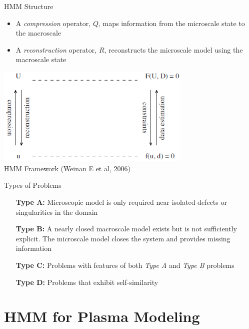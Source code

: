 \documentclass{beamer}
\begin{document}
	\begin{frame}{HMM Structure}
		\begin{itemize}
			\item  A \emph{compression} operator, $Q$, maps information from the microscale state to the macroscale
			\item  A \emph{reconstruction} operator, $R$, reconstructs the microscale model using the macroscale state
		\end{itemize}
		\begin{center}
			\includegraphics[width=0.7\textwidth]{framework.png}
			\\\tiny HMM Framework (Weinan E et al, 2006)
		\end{center}
	\end{frame}
	
	\begin{frame}{Types of Problems}
		\begin{enumerate}[leftmargin=1.75cm]
			\item[\textbf{Type A:}] Microscopic model is only required near isolated defects or singularities in the domain
			\vspace{1em}
			\item[\textbf{Type B:}] A nearly closed macroscale model exists but is not sufficiently explicit. The microscale model closes the system and provides missing information
			\vspace{1em}
			\item[\textbf{Type C:}] Problems with features of both \emph{Type A} and \emph{Type B} problems
			\vspace{1em}
			\item[\textbf{Type D:}] Problems that exhibit self-similarity
		\end{enumerate}
	\end{frame}
	

	

	
	
	
	\section{HMM for Plasma Modeling}
\end{document}

